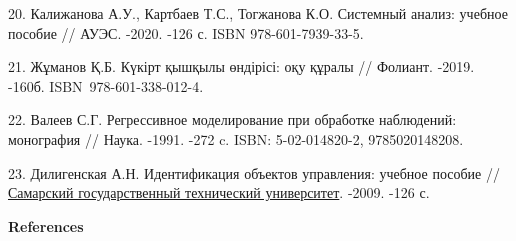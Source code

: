\begin{refs}
20. Калижанова А.У., Картбаев Т.С., Тогжанова К.О. Системный анализ:
учебное пособие // АУЭС. -2020. -126 с. ISBN 978-601-7939-33-5.

21. Жұманов Қ.Б. Күкірт қышқылы өндірісі: оқу құралы // Фолиант. -2019.
-160б. ISBN~978-601-338-012-4.

22. Валеев С.Г. Регрессивное моделирование при обработке наблюдений:
монография // Наука. -1991. -272 c. ISBN: 5-02-014820-2, 9785020148208.

23. Дилигенская А.Н. Идентификация объектов управления: учебное пособие
// \href{https://samgtu.ru/}{Самарский государственный технический
университет}. -2009. -126 с.
\end{refs}

\begin{center}
{\bfseries References}
\end{center}

